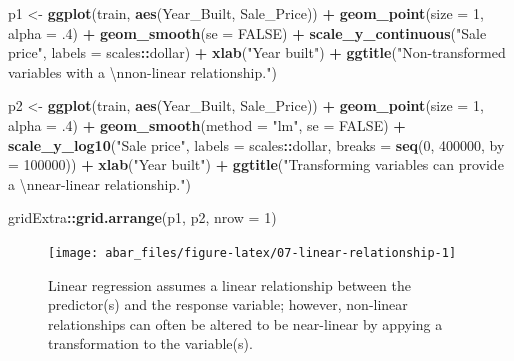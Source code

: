 \documentclass[]{book}
\newenvironment{Shaded}{\begin{snugshade}}{\end{snugshade}}
\newcommand{\CharTok}[1]{\textcolor[rgb]{0.31,0.60,0.02}{#1}}
\newcommand{\DataTypeTok}[1]{\textcolor[rgb]{0.13,0.29,0.53}{#1}}
\newcommand{\DecValTok}[1]{\textcolor[rgb]{0.00,0.00,0.81}{#1}}
\newcommand{\FloatTok}[1]{\textcolor[rgb]{0.00,0.00,0.81}{#1}}
\newcommand{\KeywordTok}[1]{\textcolor[rgb]{0.13,0.29,0.53}{\textbf{#1}}}
\newcommand{\NormalTok}[1]{#1}
\newcommand{\OperatorTok}[1]{\textcolor[rgb]{0.81,0.36,0.00}{\textbf{#1}}}
\newcommand{\OtherTok}[1]{\textcolor[rgb]{0.56,0.35,0.01}{#1}}
\newcommand{\StringTok}[1]{\textcolor[rgb]{0.31,0.60,0.02}{#1}}
\theoremstyle{definition}
\theoremstyle{definition}
\theoremstyle{definition}
\theoremstyle{remark}
\begin{document}
\begin{Shaded}
\begin{Highlighting}[]
\NormalTok{p1 <-}\StringTok{ }\KeywordTok{ggplot}\NormalTok{(train, }\KeywordTok{aes}\NormalTok{(Year_Built, Sale_Price)) }\OperatorTok{+}\StringTok{ }
\StringTok{  }\KeywordTok{geom_point}\NormalTok{(}\DataTypeTok{size =} \DecValTok{1}\NormalTok{, }\DataTypeTok{alpha =} \FloatTok{.4}\NormalTok{) }\OperatorTok{+}
\StringTok{  }\KeywordTok{geom_smooth}\NormalTok{(}\DataTypeTok{se =} \OtherTok{FALSE}\NormalTok{) }\OperatorTok{+}
\StringTok{  }\KeywordTok{scale_y_continuous}\NormalTok{(}\StringTok{"Sale price"}\NormalTok{, }\DataTypeTok{labels =}\NormalTok{ scales}\OperatorTok{::}\NormalTok{dollar) }\OperatorTok{+}
\StringTok{  }\KeywordTok{xlab}\NormalTok{(}\StringTok{"Year built"}\NormalTok{) }\OperatorTok{+}
\StringTok{  }\KeywordTok{ggtitle}\NormalTok{(}\StringTok{"Non-transformed variables with a }\CharTok{\textbackslash{}n}\StringTok{non-linear relationship."}\NormalTok{)}

\NormalTok{p2 <-}\StringTok{ }\KeywordTok{ggplot}\NormalTok{(train, }\KeywordTok{aes}\NormalTok{(Year_Built, Sale_Price)) }\OperatorTok{+}\StringTok{ }
\StringTok{  }\KeywordTok{geom_point}\NormalTok{(}\DataTypeTok{size =} \DecValTok{1}\NormalTok{, }\DataTypeTok{alpha =} \FloatTok{.4}\NormalTok{) }\OperatorTok{+}\StringTok{ }
\StringTok{  }\KeywordTok{geom_smooth}\NormalTok{(}\DataTypeTok{method =} \StringTok{"lm"}\NormalTok{, }\DataTypeTok{se =} \OtherTok{FALSE}\NormalTok{) }\OperatorTok{+}
\StringTok{  }\KeywordTok{scale_y_log10}\NormalTok{(}\StringTok{"Sale price"}\NormalTok{, }\DataTypeTok{labels =}\NormalTok{ scales}\OperatorTok{::}\NormalTok{dollar, }\DataTypeTok{breaks =} \KeywordTok{seq}\NormalTok{(}\DecValTok{0}\NormalTok{, }\DecValTok{400000}\NormalTok{, }\DataTypeTok{by =} \DecValTok{100000}\NormalTok{)) }\OperatorTok{+}
\StringTok{  }\KeywordTok{xlab}\NormalTok{(}\StringTok{"Year built"}\NormalTok{) }\OperatorTok{+}
\StringTok{  }\KeywordTok{ggtitle}\NormalTok{(}\StringTok{"Transforming variables can provide a }\CharTok{\textbackslash{}n}\StringTok{near-linear relationship."}\NormalTok{)}

\NormalTok{gridExtra}\OperatorTok{::}\KeywordTok{grid.arrange}\NormalTok{(p1, p2, }\DataTypeTok{nrow =} \DecValTok{1}\NormalTok{)}
\end{Highlighting}
\end{Shaded}

\begin{figure}

{\centering \texttt{[image: abar\_files/figure-latex/07-linear-relationship-1]} 

}

\caption{Linear regression assumes a linear relationship between the predictor(s) and the response variable; however, non-linear relationships can often be altered to be near-linear by appying a transformation to the variable(s).}\label{fig:07-linear-relationship}
\end{figure}
\end{document}
